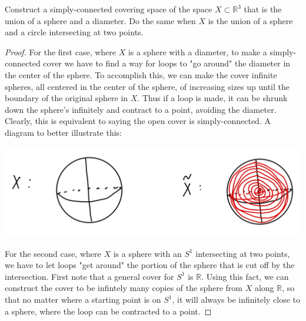 \documentclass[12pt]{article}
\newenvironment{statement}[2][Statement]{\begin{trivlist}
\item[\hskip \labelsep {\bfseries #1}\hskip \labelsep {\bfseries #2.}]}{\end{trivlist}}
\begin{document}
\begin{statement}[Problem]{3}
  Construct a simply-connected covering space of the space $X \subset \mathbb{R}^3$ that is the union 
  of a sphere and a diameter. Do the same when $X$ is the union of a sphere and a circle intersecting
  at two points. 
\end{statement}
\begin{proof}
  \par For the first case, where $X$ is a sphere with a diameter, to make a simply-connected cover we have to find a 
  way for loops to "go around" the diameter in the center of the sphere. To accomplish this, we can make the cover
  infinite spheres, all centered in the center of the sphere, of increasing sizes up until the boundary of the original
  sphere in $X$. Thus if a loop is made, it can be shrunk down the sphere's infinitely and contract to a point, 
  avoiding the diameter. Clearly, this is equivalent to saying the open cover is simply-connected.
  A diagram to better illustrate this: 
  \par \begin{center} \includegraphics[scale=.2]{3-1.png} \end{center} 
  \par For the second case, where $X$ is a sphere with an $S^1$ intersecting at two points, we have to let loops 
  "get around" the portion of the sphere that is cut off by the intersection. First note that a general cover 
  for $S^1$ is $\mathbb{R}$. Using this fact, we can construct the cover to be infintely many copies of the sphere from 
  $X$ along $\mathbb{R}$, so that no matter where a starting point is on $S^1$, it will always be infinitely
  close to a sphere, where the loop can be contracted to a point.
\end{proof}
\end{document}
